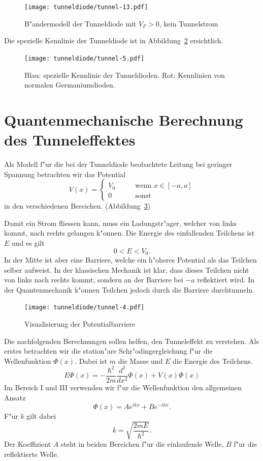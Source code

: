 \begin{refsection}
\begin{figure}
\centering
\texttt{[image: tunneldiode/tunnel-13.pdf]}
\caption{B"andermodell der Tunneldiode mit $V_F > 0$, kein Tunnelstrom
\label{tunnel:Baendermodellmin}}
\end{figure}

Die spezielle Kennlinie der Tunneldiode ist in Abbildung~\ref{tunnel:Tunneldiode} ersichtlich.

\begin{figure}	%
\centering
\texttt{[image: tunneldiode/tunnel-5.pdf]}
\caption{Blau: spezielle Kennlinie der Tunneldioden. Rot: Kennlinien von normalen Germaniumdioden.
\label{tunnel:Tunneldiode}}
\end{figure}

\section{Quantenmechanische Berechnung des Tunneleffektes}
\label{tunnel:tunneleffekt}
Als Modell f"ur die bei der Tunneldiode beobachtete Leitung bei geringer Spannung betrachten wir das Potential
\[
V(x)=\begin{cases}
V_0& \qquad \text{wenn } x \in [-a,a]\\
0&   \qquad \text{sonst}
\end{cases}
\]
in den verschiedenen Bereichen. (Abbildung~\ref{tunnel:Potentialbarriere})

Damit ein Strom fliessen kann, muss ein Ladungstr"ager, welcher von links kommt, nach rechts gelangen k"onnen. 
Die Energie des einfallenden Teilchens ist $E$ und es gilt
\[
0 < E < V_0.
\]
In der Mitte ist aber eine Barriere, welche ein h"oheres Potential als das Teilchen selber aufweist. 
In der klassischen Mechanik ist klar, dass dieses Teilchen nicht von links nach rechts kommt, sondern an der Barriere bei $-a$ reflektiert wird. 
In der Quantenmechanik k"onnen Teilchen jedoch durch die Barriere durchtunneln.

\begin{figure}	%
\centering
\texttt{[image: tunneldiode/tunnel-4.pdf]}
\caption{Visualisierung der Potentialbarriere
\label{tunnel:Potentialbarriere}}
\end{figure}

Die nachfolgenden Berechnungen sollen helfen, den Tunneleffekt zu verstehen.  
Als erstes betrachten wir die station"are Schr"odingergleichung f"ur die Wellenfunktion $\Phi(x)$. 
Dabei ist $m$ die Masse und $E$ die Energie des Teilchens.
\[
E\Phi(x) = -\frac{\hbar^2}{2m}\frac{d^2}{dx^2}\Phi(x) + V(x)\Phi(x)
\]
Im Bereich \textrm{I} und \textrm{III} verwenden wir f"ur die Wellenfunktion den allgemeinen Ansatz
\[
\Phi(x) = Ae^{ikx}+Be^{-ikx}.
\]
F"ur $k$ gilt dabei
\[
k = \sqrt{\frac{2mE}{\hbar^2}}.
\]
Der Koeffizient $A$ steht in beiden Bereichen f"ur die einlaufende Welle, $B$ f"ur die reflektierte Welle.


\end{refsection}
